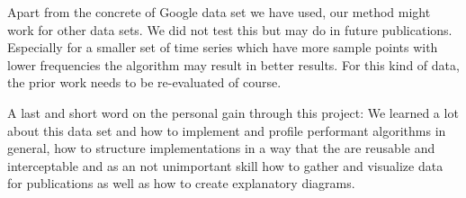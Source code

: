 Apart from the concrete of Google data set we have used, our method might work for other data sets. We did not test this but may do in future publications. Especially for a smaller set of time series which have more sample points with lower frequencies the algorithm may result in better results. For this kind of data, the prior work needs to be re-evaluated of course.

A last and short word on the personal gain through this project: We learned a lot about this data set and how to implement and profile performant algorithms in general, how to structure implementations in a way that the are reusable and interceptable and as an not unimportant skill how to gather and visualize data for publications as well as how to create explanatory diagrams.
